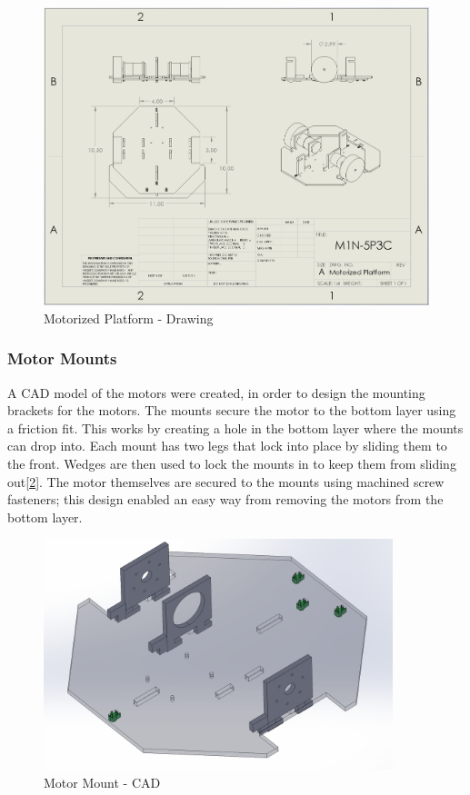 \documentclass{article}
\begin{document}
\begin{figure}[H]
    \centering
    \includegraphics[width = 5in]{MotorizedPlatform.PNG}
    \caption{Motorized Platform - Drawing}
    \label{fig:MotorizedPlatform}
\end{figure}

\subsubsection{Motor Mounts}
A CAD model of the motors were created, in order to design the mounting brackets for the motors. The mounts secure the motor to the bottom layer using a friction fit. This works by creating a hole in the bottom layer where the mounts can drop into. Each mount has two legs that lock into place by sliding them to the front. Wedges are then used to lock the mounts in to keep them from sliding out[\ref{fig:MotorMounting}]. The motor themselves are secured to the mounts using machined screw fasteners; this design enabled an easy way from removing the motors from the bottom layer.

\begin{figure}[H]
    \centering
    \includegraphics[width = 4in]{MotorMounting.PNG}
    \caption{Motor Mount - CAD}
    \label{fig:MotorMounting}
\end{figure}
\end{document}
